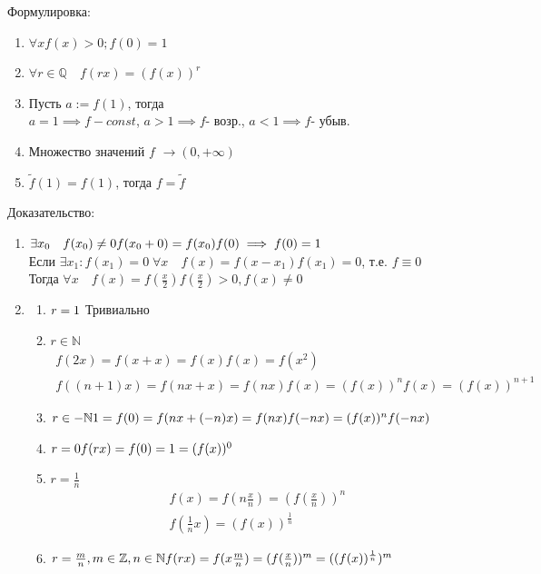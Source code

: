 \documentclass{article}
\begin{document}
Формулировка:
\begin{enumerate}
    \item $\forall x f(x) > 0; f(0) = 1$
    \item $\forall r \in \mathbb{Q} \quad f(rx) = (f(x))^r$
    \item Пусть $a:= f(1)$, тогда \\$a=1 \implies f-const$, $a > 1 \implies f \text{- возр.}$, $a < 1 \implies f \text{- убыв.}$
    \item Множество значений $f$ $\rightarrow (0, +\infty)$
    \item $\tilde f(1) = f(1)$, тогда $f = \tilde f$
\end{enumerate}
Доказательство:
\begin{enumerate}
    \item $\exists x_0 \quad f(x_0) \ne 0\\ f(x_0+0) = f(x_0) f(0) \implies f(0) = 1$\\
    Если $\exists x_1: f(x_1) = 0 \; \forall x \quad f(x) = f(x-x_1)f(x_1)=0$, т.е. $f\equiv 0$\\
    Тогда $\forall x \quad f(x) = f(\frac{x}{2})f(\frac{x}{2}) > 0, f(x) \ne 0$
    
    \item \begin{enumerate} 
        \item $r = 1 \hfill$ Тривиально
        \item $r \in \mathbb{N}$ 
        \begin{align}
        f(2x) = f(x+x) = f(x) f(x) = f(x^2)\\
        f((n+1)x)=f(nx+x)=f(nx)f(x)=(f(x))^nf(x)=(f(x))^{n+1}
        \end{align}
        
        \item $r \in -\mathbb{N} \hfill 1=f(0)=f(nx+(-n)x)=f(nx)f(-nx)=(f(x))^nf(-nx)$
        
        \item $r = 0 \hfill f(rx) = f(0) = 1 = (f(x))^0$
        
        \item $r=\frac{1}{n}$
        \begin{align}
        f(x)=f(n\frac{x}{n})=(f(\frac{x}{n}))^n\\
        f(\frac{1}{n}x)=(f(x))^{\frac{1}{n}}
        \end{align}
        
        \item $r=\frac{m}{n}, m\in \mathbb{Z}, n \in \mathbb{N} \hfill f(rx) = f(x\frac{m}{n}) = (f(\frac{x}{n}))^m=((f(x))^\frac{1}{n})^m$
    \end{enumerate}


\end{enumerate}
\end{document}
